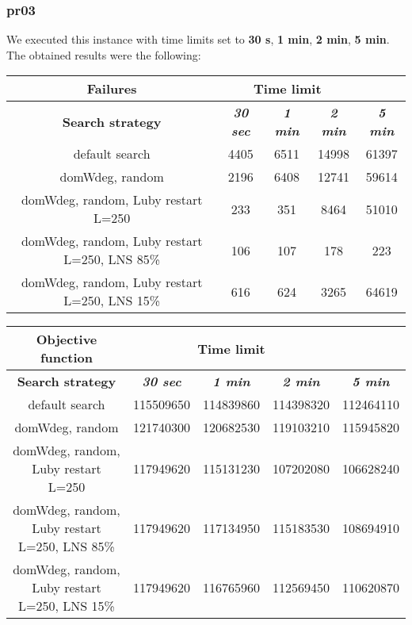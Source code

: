 \subsubsection{pr03}
We executed this instance with time limits set to \textbf{30 s}, \textbf{1 min}, \textbf{2 min}, \textbf{5 min}.\\
The obtained results were the following:
{
\renewcommand{\arraystretch}{2}
\begin{longtable}[h]{| c | c | c | c | c |}
    \hline
    \textbf{Failures} & \multicolumn{3}{c}{Time limit} & \\
    \hline
    \textbf{Search strategy} & \textbf{\textit{30 sec}} & \textbf{\textit{1 min}} & \textbf{\textit{2 min}} & \textbf{\textit{5 min}} \\
    \hline
    \endhead
    default search                                &  4405 &  6511 & 14998 &  61397 \\
    \hline
    domWdeg, random                               &  2196 &  6408 & 12741 &  59614 \\
    \hline
    domWdeg, random, Luby restart L=250           &   233 &   351 &  8464 &  51010 \\
    \hline
    domWdeg, random, Luby restart L=250, LNS 85\% &   106 &   107 &   178 &    223 \\
    \hline
    domWdeg, random, Luby restart L=250, LNS 15\% &   616 &   624 &  3265 &  64619 \\
    \hline
\end{longtable}
}

{
\renewcommand{\arraystretch}{2}
\begin{longtable}[h]{| c | c | c | c | c |}
    \hline
    \textbf{Objective function} & \multicolumn{3}{c}{Time limit} & \\
    \hline
    \textbf{Search strategy} & \textbf{\textit{30 sec}} & \textbf{\textit{1 min}} & \textbf{\textit{2 min}} & \textbf{\textit{5 min}} \\
    \hline
    \endhead
    default search                                & 115509650 & 114839860 & 114398320 & 112464110 \\
    \hline
    domWdeg, random                               & 121740300 & 120682530 & 119103210 & 115945820 \\
    \hline
    domWdeg, random, Luby restart L=250           & 117949620 & 115131230 & 107202080 & 106628240 \\
    \hline
    domWdeg, random, Luby restart L=250, LNS 85\% & 117949620 & 117134950 & 115183530 & 108694910 \\
    \hline
    domWdeg, random, Luby restart L=250, LNS 15\% & 117949620 & 116765960 & 112569450 & 110620870 \\
    \hline
\end{longtable}
}
